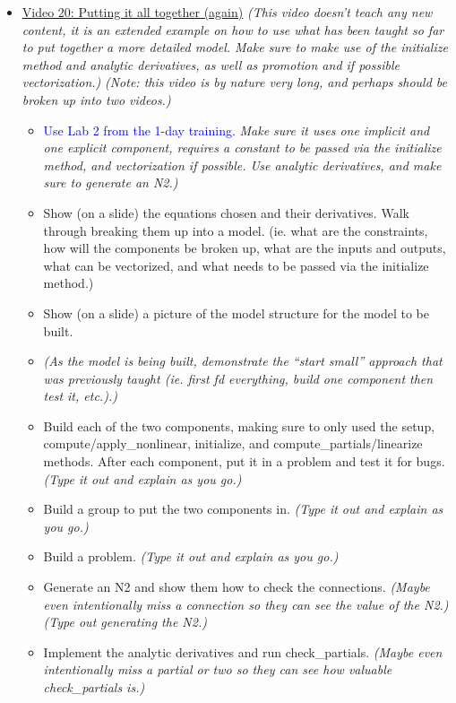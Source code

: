 \documentclass[12pt, letterpaper]{article}
\begin{document}
\begin{itemize}
	\item \underline{Video 20: Putting it all together (again)} \textit{(This video doesn’t teach any new content, it is an extended example on how to use what has been taught so far to put together a more detailed model. Make sure to make use of the initialize method and analytic derivatives, as well as promotion and if possible vectorization.)} \textit{(Note: this video is by nature very long, and perhaps should be broken up into two videos.)}
		\begin{itemize}
			\item \textcolor{blue}{Use Lab 2 from the 1-day training.} \textit{Make sure it uses one implicit and one explicit component, requires a constant to be passed via the initialize method, and vectorization if possible. Use analytic derivatives, and make sure to generate an N2.)}
			\item Show (on a slide) the equations chosen and their derivatives. Walk through breaking them up into a model. (ie. what are the constraints, how will the components be broken up, what are the inputs and outputs, what can be vectorized, and what needs to be passed via the initialize method.)
			\item Show (on a slide) a picture of the model structure for the model to be built.
			\item \textit{(As the model is being built, demonstrate the ``start small'' approach that was previously taught (ie. first fd everything, build one component then test it, etc.).)}
			\item Build each of the two components, making sure to only used the setup, compute/apply\_nonlinear, initialize, and compute\_partials/linearize methods. After each component, put it in a problem and test it for bugs. \textit{(Type it out and explain as you go.)}
			\item Build a group to put the two components in. \textit{(Type it out and explain as you go.)}
			\item Build a problem. \textit{(Type it out and explain as you go.)}
			\item Generate an N2 and show them how to check the connections. \textit{(Maybe even intentionally miss a connection so they can see the value of the N2.)} \textit{(Type out generating the N2.)}
			\item Implement the analytic derivatives and run check\_partials. \textit{(Maybe even intentionally miss a partial or two so they can see how valuable check\_partials is.)}

\end{itemize}
\end{itemize}
\end{document}
